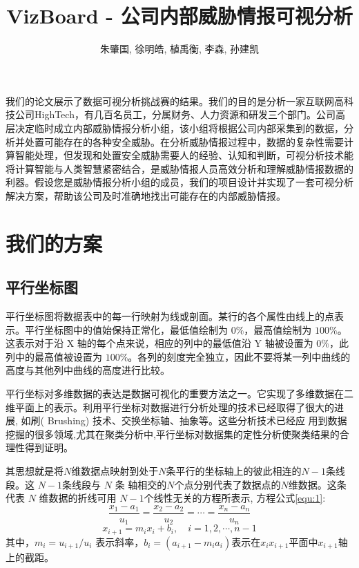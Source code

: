 \documentclass[journal]{vgtc}                %
\title{VizBoard - 公司内部威胁情报可视分析}
\author{朱肇国, 徐明皓, 植禹衡, 李森, 孙建凯}
\begin{document}


\maketitle

我们的论文展示了数据可视分析挑战赛的结果。我们的目的是分析一家互联网高科技公司HighTech，有几百名员工，分属财务、人力资源和研发三个部门。公司高层决定临时成立内部威胁情报分析小组，该小组将根据公司内部采集到的数据，分析并处置可能存在的各种安全威胁。在分析威胁情报过程中，数据的复杂性需要计算智能处理，但发现和处置安全威胁需要人的经验、认知和判断，可视分析技术能将计算智能与人类智慧紧密结合，是威胁情报人员高效分析和理解威胁情报数据的利器。假设您是威胁情报分析小组的成员，我们的项目设计并实现了一套可视分析解决方案，帮助该公司及时准确地找出可能存在的内部威胁情报。

\section{我们的方案}
\subsection{平行坐标图}
平行坐标图将数据表中的每一行映射为线或剖面。某行的各个属性由线上的点表示。平行坐标图中的值始保持正常化，最低值绘制为 $0\%$，最高值绘制为 $100\%$。这表示对于沿 X 轴的每个点来说，相应的列中的最低值沿 Y 轴被设置为 $0\%$，此列中的最高值被设置为 $100\%$。各列的刻度完全独立，因此不要将某一列中曲线的高度与其他列中曲线的高度进行比较。

平行坐标对多维数据的表达是数据可视化的重要方法之一。它实现了多维数据在二维平面上的表示。利用平行坐标对数据进行分析处理的技术已经取得了很大的进展, 如刷( Brushing) 技术、交换坐标轴、抽象等。这些分析技术已经应 用到数据挖掘的很多领域,尤其在聚类分析中,平行坐标对数据集的定性分析使聚类结果的合理性得到证明。

其思想就是将$N$维数据点映射到处于$N$条平行的坐标轴上的彼此相连的$N-1$条线段。这 $N - 1$条线段与 $N$ 条 轴相交的$N$个点分别代表了数据点的$N$维数据。这条代表 $N$ 维数据的折线可用 $N -1$个线性无关的方程所表示, 方程公式\ref{equ:1}:
\begin{equation}
\label{equ:1}
\frac{x_1-a_1}{u_1}=\frac{x_2-a_2}{u_2}=\cdots = \frac{x_n-a_n}{u_n}
\end{equation}
\begin{equation}
\label{equ:2}
x_{i+1} = m_ix_i+b_i, \quad i = 1, 2, \cdots, n-1
\end{equation}
其中，$m_i = u_{i+1} / u_i$ 表示斜率，$b_i = (a_{i+1} - m_ia_i)$表示在$x_ix_{i+1}$平面中$x_{i+1}$轴上的截距。
\end{document}
